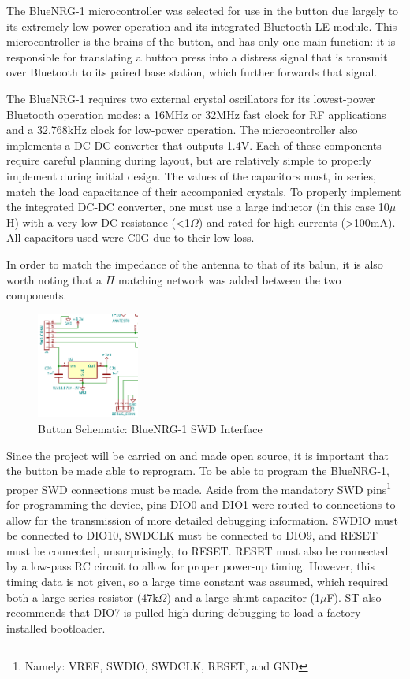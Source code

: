 \documentclass[journal,compsoc]{IEEEtran}
\begin{document}
The BlueNRG-1 microcontroller was selected for use in the button due largely to its extremely low-power operation and its integrated Bluetooth LE module.  This microcontroller is the brains of the button, and has only one main function: it is responsible for translating a button press into a distress signal that is transmit over Bluetooth to its paired base station, which further forwards that signal.

The BlueNRG-1 requires two external crystal oscillators for its lowest-power Bluetooth operation modes: a 16MHz or 32MHz fast clock for RF applications and a 32.768kHz clock for low-power operation. The microcontroller also implements a DC-DC converter that outputs 1.4V. Each of these components require careful planning during layout, but are relatively simple to properly implement during initial design.  The values of the capacitors must, in series, match the load capacitance of their accompanied crystals.  To properly implement the integrated DC-DC converter, one must use a large inductor (in this case 10$\mu$H) with a very low DC resistance (<1$\Omega$) and rated for high currents (>100mA).  All capacitors used were C0G due to their low loss.

In order to match the impedance of the antenna to that of its balun, it is also worth noting that a $\Pi$ matching network was added between the two components.

\begin{figure}[H]
\centering
\includegraphics[width=0.3\textwidth]{buttswd.PNG}
\caption{Button Schematic: BlueNRG-1 SWD Interface}
\label{buttswd}
\end{figure}

Since the project will be carried on and made open source, it is important that the button be made able to reprogram.  To be able to program the BlueNRG-1, proper SWD connections must be made.  Aside from the mandatory SWD pins\footnote{Namely: VREF, SWDIO, SWDCLK, RESET, and GND} for programming the device, pins DIO0 and DIO1 were routed to connections to allow for the transmission of more detailed debugging information.  SWDIO must be connected to DIO10, SWDCLK must be connected to DIO9, and RESET must be connected, unsurprisingly, to RESET.  RESET must also be connected by a low-pass RC circuit to allow for proper power-up timing.  However, this timing data is not given, so a large time constant was assumed, which required both a large series resistor (47k$\Omega$) and a large shunt capacitor (1$\mu$F).  ST also recommends that DIO7 is pulled high during debugging to load a factory-installed bootloader.
\end{document}
